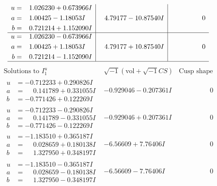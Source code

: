 \documentclass[1p]{elsarticle_modified}
\theoremstyle{definition}
\newcommand{\I}{\sqrt{-1}}
\begin{document}
$$\begin{array}{c|c|c}
\begin{aligned}
u &= \phantom{-}1.026230 + 0.673966 I \\
a &= \phantom{-}1.00425 - 1.18053 I \\
b &= \phantom{-}0.721214 + 1.152090 I\end{aligned}
 & \phantom{-}4.79177 - 10.87540 I & \phantom{-0.000000 } 0 \\ \hline\begin{aligned}
u &= \phantom{-}1.026230 - 0.673966 I \\
a &= \phantom{-}1.00425 + 1.18053 I \\
b &= \phantom{-}0.721214 - 1.152090 I\end{aligned}
 & \phantom{-}4.79177 + 10.87540 I & \phantom{-0.000000 } 0\\
 \hline 
 \end{array}$$\newpage$$\begin{array}{c|c|c}  
\text{Solutions to }I^u_{1}& \I (\text{vol} + \sqrt{-1}CS) & \text{Cusp shape}\\
 \hline 
\begin{aligned}
u &= -0.712233 + 0.290826 I \\
a &= \phantom{-}0.141789 + 0.331055 I \\
b &= -0.771426 + 0.122269 I\end{aligned}
 & -0.929046 - 0.207361 I & \phantom{-0.000000 } 0 \\ \hline\begin{aligned}
u &= -0.712233 - 0.290826 I \\
a &= \phantom{-}0.141789 - 0.331055 I \\
b &= -0.771426 - 0.122269 I\end{aligned}
 & -0.929046 + 0.207361 I & \phantom{-0.000000 } 0 \\ \hline\begin{aligned}
u &= -1.183510 + 0.365187 I \\
a &= \phantom{-}0.028659 + 0.180138 I \\
b &= \phantom{-}1.327950 + 0.348197 I\end{aligned}
 & -6.56609 + 7.76406 I & \phantom{-0.000000 } 0 \\ \hline\begin{aligned}
u &= -1.183510 - 0.365187 I \\
a &= \phantom{-}0.028659 - 0.180138 I \\
b &= \phantom{-}1.327950 - 0.348197 I\end{aligned}
 & -6.56609 - 7.76406 I & \phantom{-0.000000 } 0 \\ \hline\begin{aligned}

\end{aligned}
\end{array}$$
\end{document}
